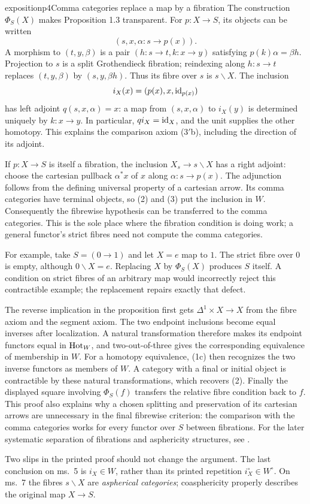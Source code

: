 \begin{dcomment}{exposition}{p4}{Comma categories replace a map by a fibration}
The construction $\Phi_S(X)$ makes Proposition 1.3 transparent. For $p:X\to S$, its objects can be written
\[
(s,x,\alpha:s\longrightarrow p(x)).
\]
A morphism to $(t,y,\beta)$ is a pair $(h:s\to t,k:x\to y)$ satisfying $p(k)\alpha=\beta h$. Projection to $s$ is a split Grothendieck fibration; reindexing along $h:s\to t$ replaces $(t,y,\beta)$ by $(s,y,\beta h)$. Thus its fibre over $s$ is $s\backslash X$. The inclusion
\[
i_X(x)=(p(x),x,\mathrm{id}_{p(x)})
\]
has left adjoint $q(s,x,\alpha)=x$: a map from $(s,x,\alpha)$ to $i_X(y)$ is determined uniquely by $k:x\to y$. In particular, $qi_X=\mathrm{id}_X$, and the unit supplies the other homotopy. This explains the comparison axiom (3$'$b), including the direction of its adjoint.

If $p:X\to S$ is itself a fibration, the inclusion $X_s\to s\backslash X$ has a right adjoint: choose the cartesian pullback $\alpha^*x$ of $x$ along $\alpha:s\to p(x)$. The adjunction follows from the defining universal property of a cartesian arrow. Its comma categories have terminal objects, so (2) and (3) put the inclusion in $W$. Consequently the fibrewise hypothesis can be transferred to the comma categories. This is the sole place where the fibration condition is doing work; a general functor's strict fibres need not compute the comma categories.

For example, take $S=(0\to1)$ and let $X=e$ map to $1$. The strict fibre over $0$ is empty, although $0\backslash X=e$. Replacing $X$ by $\Phi_S(X)$ produces $S$ itself. A condition on strict fibres of an arbitrary map would incorrectly reject this contractible example; the replacement repairs exactly that defect.

The reverse implication in the proposition first gets $\Delta^1\times X\to X$ from the fibre axiom and the segment axiom. The two endpoint inclusions become equal inverses after localization. A natural transformation therefore makes its endpoint functors equal in $\mathrm{Hot}_W$, and two-out-of-three gives the corresponding equivalence of membership in $W$. For a homotopy equivalence, (1c) then recognizes the two inverse functors as members of $W$. A category with a final or initial object is contractible by these natural transformations, which recovers (2). Finally the displayed square involving $\Phi_S(f)$ transfers the relative fibre condition back to $f$. This proof also explains why a chosen splitting and preservation of its cartesian arrows are unnecessary in the final fibrewise criterion: the comparison with the comma categories works for every functor over $S$ between fibrations. For the later systematic separation of fibrations and asphericity structures, see \citet[\S1]{Maltsiniotis2005Asphericite}.

Two slips in the printed proof should not change the argument. The last conclusion on ms.~5 is $i_X\in W$, rather than its printed repetition $i_X^\circ\in W^\circ$. On ms.~7 the fibres $s\backslash X$ are \emph{aspherical categories}; coasphericity properly describes the original map $X\to S$.
\end{dcomment}


